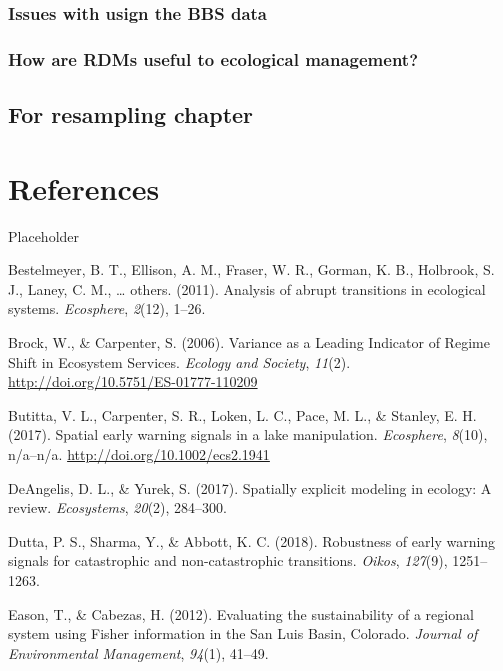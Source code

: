 \documentclass[12pt,twoside,openany]{reedthesis}
\begin{document}
\subsection{Issues with usign the BBS
data}\label{issues-with-usign-the-bbs-data}

\subsection{How are RDMs useful to ecological
management?}\label{how-are-rdms-useful-to-ecological-management}

\section{For resampling chapter}\label{for-resampling-chapter}

\chapter*{References}\label{references}

Placeholder

\hypertarget{refs}{}
\hypertarget{ref-bestelmeyer_analysis_2011}{}
Bestelmeyer, B. T., Ellison, A. M., Fraser, W. R., Gorman, K. B.,
Holbrook, S. J., Laney, C. M., \ldots{} others. (2011). Analysis of
abrupt transitions in ecological systems. \emph{Ecosphere},
\emph{2}(12), 1--26.

\hypertarget{ref-brock_variance_2006}{}
Brock, W., \& Carpenter, S. (2006). Variance as a Leading Indicator of
Regime Shift in Ecosystem Services. \emph{Ecology and Society},
\emph{11}(2). \url{http://doi.org/10.5751/ES-01777-110209}

\hypertarget{ref-butitta_spatial_2017}{}
Butitta, V. L., Carpenter, S. R., Loken, L. C., Pace, M. L., \& Stanley,
E. H. (2017). Spatial early warning signals in a lake manipulation.
\emph{Ecosphere}, \emph{8}(10), n/a--n/a.
\url{http://doi.org/10.1002/ecs2.1941}

\hypertarget{ref-deangelis2017spatially}{}
DeAngelis, D. L., \& Yurek, S. (2017). Spatially explicit modeling in
ecology: A review. \emph{Ecosystems}, \emph{20}(2), 284--300.

\hypertarget{ref-dutta2018robustness}{}
Dutta, P. S., Sharma, Y., \& Abbott, K. C. (2018). Robustness of early
warning signals for catastrophic and non-catastrophic transitions.
\emph{Oikos}, \emph{127}(9), 1251--1263.

\hypertarget{ref-eason_evaluating_2012}{}
Eason, T., \& Cabezas, H. (2012). Evaluating the sustainability of a
regional system using Fisher information in the San Luis Basin,
Colorado. \emph{Journal of Environmental Management}, \emph{94}(1),
41--49.
\end{document}
